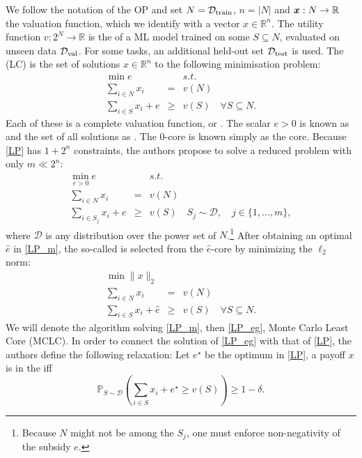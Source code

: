 We follow the notation of the OP and set $N =\mathcal{D}_{\operatorname{train}}$, $n =
| N |$ and $\boldsymbol{x}: N \rightarrow \mathbb{R}$ the valuation function,
which we identify with a vector $x \in \mathbb{R}^n$. The utility function $v
: 2^N \rightarrow \mathbb{R}$ is the {} of a ML model trained on
some $S \subseteq N$, evaluated on unseen data $\mathcal{D}_{\operatorname{val}}$. For
some tasks, an additional held-out set $\mathcal{D}_{\operatorname{test}}$ is used.
The {} (LC) is the set of solutions $x \in \mathbb{R}^n$ to
the following minimisation problem:
\begin{equation}
  \begin{array}{rccc}
    \min e &  & s.t. & \\
    \sum_{i \in N} x_i & = & v (N) & \\
    \sum_{i \in S} x_i + e & \geqslant & v (S) & \forall S \subseteq N.
  \end{array} \label{LP}
\end{equation}
Each of these is a complete valuation function, or {}. The
scalar $e > 0$ is known as {} and the set of all solutions as
{}. The 0-core is known simply as the core. Because \eqref{LP}
has $1 + 2^n$ constraints, the authors propose to solve a reduced problem with
only $m \ll 2^n$:
\begin{equation}
  \begin{array}{rccc}
    \underset{e > 0}{\min} e &  & s.t. & \\
    \sum_{i \in N} x_i & = & v (N) & \\
    \sum_{i \in S_j} x_i + e & \geqslant & v (S) & S_j \sim \mathcal{D}, \quad
    j \in \{ 1, \ldots, m \},
  \end{array} \label{LP_m}
\end{equation}
where $\mathcal{D}$ is any distribution over the power set of
$N$.\footnote{Because $N$ might not be among the $S_j$, one must enforce
non-negativity of the subsidy $e$.} After obtaining an optimal $\hat{e}$ in
\eqref{LP_m}, the so-called {} is selected from
the $\hat{e}$-core by minimizing the $\ell_2$ norm:
\begin{equation}
  \begin{array}{rccc}
    \min \| x \|_2 &  &  & \\
    \sum_{i \in N} x_i & = & v (N) & \\
    \sum_{i \in S} x_i + \hat{e} & \geqslant & v (S) & \forall S \subseteq N.
  \end{array} \label{LP_eg}
\end{equation}
We will denote the algorithm solving \eqref{LP_m}, then \eqref{LP_eg}, Monte
Carlo Least Core (MCLC). In order to connect the solution of \eqref{LP_eg}
with that of \eqref{LP}, the authors define the following relaxation: Let
$e^{\star}$ be the optimum in \eqref{LP}, a payoff $x$ is in the
{} iff
\begin{equation}
  \mathbb{P}_{S \sim \mathcal{D}} \left( \sum_{i \in S} x_i + e^{\star}
  \geqslant v (S) \right) \geqslant 1 - \delta .
  \label{eq:delta-approximate-lc}
\end{equation}
